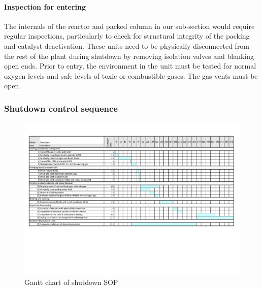 \paragraph{Inspection for entering}
The internals of the reactor and packed column in our sub-section would require regular inspections, particularly to check for structural integrity of the packing and catalyst deactivation. These units need to be physically disconnected from the rest of the plant during shutdown by removing isolation valves and blanking open ends. Prior to entry, the environment in the unit must be tested for normal oxygen levels and safe levels of toxic or combustible gases. The gas vents must be open. 


\subsubsection{Shutdown control sequence}
\begin{figure}[H]
    \centering
    \includegraphics[clip, trim= 0.5cm 6cm 0.5cm 1cm, width=\linewidth]{chapters/4-operation-control/4-Figures/Shutdown.pdf}
    \caption{Gantt chart of shutdown SOP}
    \label{fig:shutdown}
\end{figure}

